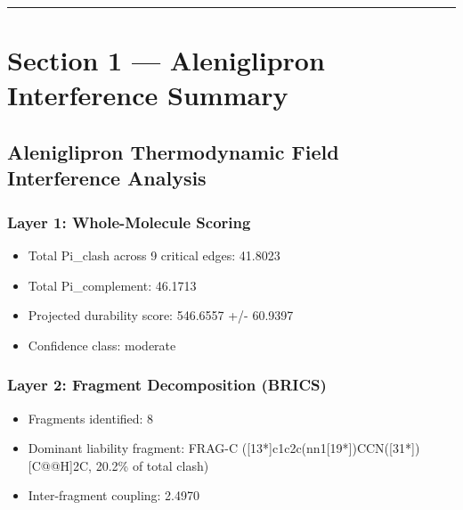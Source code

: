 \documentclass[11pt,a4paper]{article}
\providecommand{\tightlist}{\setlength{\itemsep}{0pt}\setlength{\parskip}{0pt}}
\begin{document}
\vspace{2mm}
\hrule
\vspace{4mm}

\hypertarget{section-1--aleniglipron-interference-summary}{%
\section{Section 1 --- Aleniglipron Interference
Summary}\label{section-1--aleniglipron-interference-summary}}

\hypertarget{aleniglipron-thermodynamic-field-interference-analysis}{%
\subsection{Aleniglipron Thermodynamic Field Interference
Analysis}\label{aleniglipron-thermodynamic-field-interference-analysis}}

\hypertarget{layer-1-whole-molecule-scoring}{%
\subsubsection{Layer 1: Whole-Molecule Scoring}\label{layer-1-whole-molecule-scoring}}

\begin{itemize}
\tightlist
\item
  Total Pi\_clash across 9 critical edges: 41.8023
\item
  Total Pi\_complement: 46.1713
\item
  Projected durability score: 546.6557 +/- 60.9397
\item
  Confidence class: moderate
\end{itemize}

\hypertarget{layer-2-fragment-decomposition-brics}{%
\subsubsection{Layer 2: Fragment Decomposition (BRICS)}\label{layer-2-fragment-decomposition-brics}}

\begin{itemize}
\tightlist
\item
  Fragments identified: 8
\item
  Dominant liability fragment: FRAG-C ({[}13*{]}c1c2c(nn1{[}19*{]})CCN({[}31*{]}){[}C@@H{]}2C,
  20.2\% of total clash)
\item
  Inter-fragment coupling: 2.4970
\end{itemize}
\end{document}
